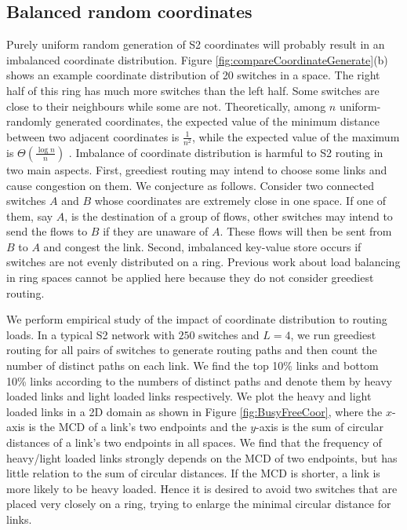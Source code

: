 \documentclass[10pt,conference]{IEEEtran}
\begin{document}
\subsection {Balanced random coordinates}
\label{sec:balance}
Purely uniform random generation of S2 coordinates will probably result in an imbalanced coordinate distribution.
Figure \ref{fig:compareCoordinateGenerate}(b) shows an example coordinate distribution of 20 switches in a space.
The right half of this ring has much more switches than the left half. Some switches are close to their neighbours while some are not.
Theoretically, among $n$ uniform-randomly generated coordinates, the expected value of the minimum distance between two adjacent coordinates is $\frac{1}{n^2}$, while the expected value of the maximum is $\Theta(\frac{\log n}{n})$ \cite{orderstatics}.
Imbalance of coordinate distribution is harmful to S2 routing in two main aspects. First, greediest routing may intend to choose some links and cause congestion on them. We conjecture as follows. Consider two connected switches $A$ and $B$ whose coordinates are extremely close in one space.  If one of them, say $A$, is the destination of a group of flows, other switches may intend to send the flows  to $B$ if they are unaware of $A$. These flows will then be sent from $B$ to $A$ and congest the link. Second, imbalanced key-value store occurs if switches are not evenly distributed on a ring. Previous work about load balancing in ring spaces cannot be applied here because they do not consider greediest routing.

We perform empirical study of the impact of coordinate distribution to routing loads. In a typical S2 network with $250$ switches and $L=4$, we run greediest routing for all pairs of switches to generate routing paths and then count the number of distinct paths on each link. We find the top 10\% links and bottom 10\% links according to the numbers of distinct paths and denote them by heavy loaded links and light loaded links respectively.
We plot the heavy and light loaded links in a 2D domain as shown in Figure \ref{fig:BusyFreeCoor}, where the $x$-axis is the MCD of a link's two endpoints  and the $y$-axis is the sum of circular distances of a link's two endpoints in all spaces. We find that the frequency of heavy/light loaded links strongly depends on the MCD of two endpoints, but has little relation to the sum of circular distances. If the MCD is shorter, a link is more likely to be heavy loaded. Hence it is desired to avoid two switches that are placed very closely on a ring, trying to enlarge the minimal circular distance for links.
\end{document}
